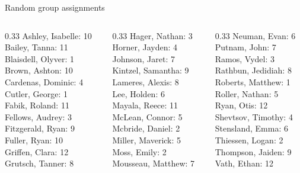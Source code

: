 \documentclass[10pt]{beamer}
\begin{document}
\begin{frame}{Random group assignments}
\begin{columns}
\begin{column}{0.33\textwidth}
Ashley, Isabelle: 10 \\ 
Bailey, Tanna: 11 \\ 
Blaisdell, Olyver: 1 \\ 
Brown, Ashton: 10 \\ 
Cardenas, Dominic: 4 \\ 
Cutler, George: 1 \\ 
Fabik, Roland: 11 \\ 
Fellows, Audrey: 3 \\ 
Fitzgerald, Ryan: 9 \\ 
Fuller, Ryan: 10 \\ 
Griffen, Clara: 12 \\ 
Grutsch, Tanner: 8 \\\end{column}
\begin{column}{0.33\textwidth}
Hager, Nathan: 3 \\ 
Horner, Jayden: 4 \\ 
Johnson, Jaret: 7 \\ 
Kintzel, Samantha: 9 \\ 
Lameres, Alexis: 8 \\ 
Lee, Holden: 6 \\ 
Mayala, Reece: 11 \\ 
McLean, Connor: 5 \\ 
Mcbride, Daniel: 2 \\ 
Miller, Maverick: 5 \\ 
Moss, Emily: 2 \\ 
Mousseau, Matthew: 7 \\\end{column}
\begin{column}{0.33\textwidth}
Neuman, Evan: 6 \\ 
Putnam, John: 7 \\ 
Ramos, Vydel: 3 \\ 
Rathbun, Jedidiah: 8 \\ 
Roberts, Matthew: 1 \\ 
Roller, Nathan: 5 \\ 
Ryan, Otis: 12 \\ 
Shevtsov, Timothy: 4 \\ 
Stensland, Emma: 6 \\ 
Thiessen, Logan: 2 \\ 
Thompson, Jaiden: 9 \\ 
Vath, Ethan: 12 \\\end{column}
\end{columns}
\end{frame}
\end{document}
